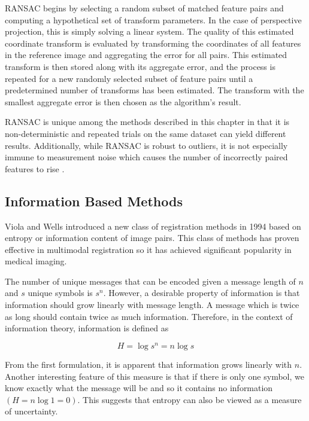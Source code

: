 \documentclass[tocnosub,noragright,centerchapter,12pt]{uiucecethesis09}
\begin{document}
RANSAC begins by selecting a random subset of matched feature pairs and computing a hypothetical set of transform parameters.  In the case of perspective projection, this is simply solving a linear system.  The quality of this estimated coordinate transform is evaluated by transforming the coordinates of all features in the reference image and aggregating the error for all pairs.  This estimated transform is then stored along with its aggregate error, and the process is repeated for a new randomly selected subset of feature pairs until a predetermined number of transforms has been estimated.  The transform with the smallest aggregate error is then chosen as the algorithm's result.

RANSAC is unique among the methods described in this chapter in that it is non-deterministic and repeated trials on the same dataset can yield different results.  Additionally, while RANSAC is robust to outliers, it is not especially immune to measurement noise which causes the number of incorrectly paired features to rise \cite{french}.


\subsection{Information Based Methods}

Viola and Wells \cite{viola} introduced a new class of registration methods in 1994 based on entropy or information content of image pairs.  This class of methods has proven effective in multimodal registration so it has achieved significant popularity in medical imaging.

The number of unique messages that can be encoded given a message length of $n$ and $s$ unique symbols is $s^n$.  However, a desirable property of information is that information should grow linearly with message length.  A message which is twice as long should contain twice as much information.  Therefore, in the context of information theory, information is defined as

$$
H = \log s^n = n \log s
$$

From the first formulation, it is apparent that information grows linearly with $n$.  Another interesting feature of this measure is that if there is only one symbol, we know exactly what the message will be and so it contains no information $(H = n \log 1 = 0)$.  This suggests that entropy can also be viewed as a measure of uncertainty.
\end{document}

